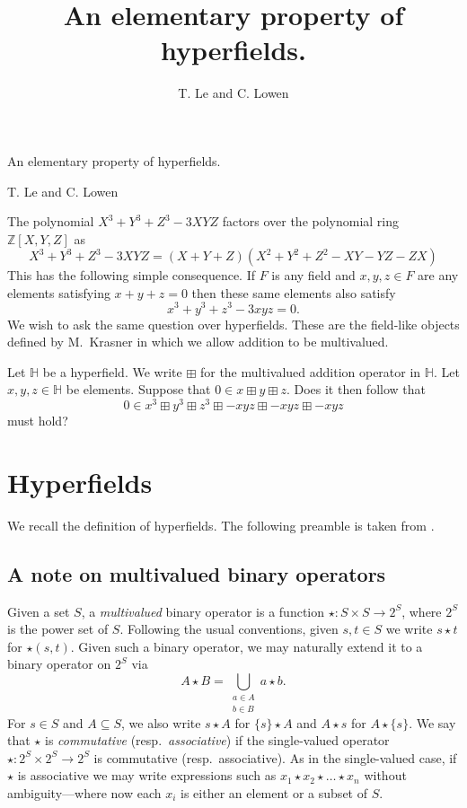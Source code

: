 \documentclass[reqno]{amsart}
\title{An elementary property of hyperfields.}
\author{T. Le and C. Lowen}
\theoremstyle{definition}
\theoremstyle{remark}
\begin{document}
\thispagestyle{plain}
\begin{center}
{\Large An elementary property of hyperfields.}\par\medskip
T. Le and C. Lowen
\end{center}

The polynomial $X^3+Y^3+Z^3-3XYZ$ factors over the polynomial ring $\mathbb{Z}[X,Y,Z]$ as
\[ X^3+Y^3+Z^3-3XYZ = (X+Y+Z)(X^2+Y^2+Z^2-XY-YZ-ZX) \]
This has the following simple consequence. If $F$ is any field and $x,y,z\in F$ are any elements satisfying $x+y+z=0$ then these same elements also satisfy
\[ x^3+y^3+z^3-3xyz=0. \]
We wish to ask the same question over hyperfields. These are the field-like objects defined by M.~Krasner in which we allow addition to be multivalued.

Let $\mathbb{H}$ be a hyperfield. We write $\boxplus$ for the multivalued addition operator in $\mathbb{H}$. Let $x,y,z\in\mathbb{H}$ be elements. Suppose that $0\in x\boxplus y\boxplus z$. Does it then follow that
\[ 0 \in x^3 \boxplus y^3 \boxplus z^3 \boxplus -xyz \boxplus -xyz \boxplus -xyz \]
must hold?
\newpage
\maketitle
\section{Hyperfields}\label{sec:problem}

We recall the definition of hyperfields. 
The following preamble is taken from \cite{le26}.
\subsection*{A note on multivalued binary operators} Given a set $S$, a \emph{multivalued} binary operator is a function $\star\colon S \times S \to 2^S$, where $2^S$ is the power set of $S$. 
Following the usual conventions, given $s, t \in S$ we write 
$s \star t$ for $\star(s, t)$.
Given such a binary operator, we may naturally extend it to a binary operator on $2^S$ via
\[
    A \star B = \bigcup_{\substack{a \in A\\b \in B}} a \star b.
\]
For $s \in S$ and $A \subseteq S$, we also write $s \star A$ for $\{s\} \star A$ and $A \star s$ for $A \star \{s\}$.
We say that $\star$ is \emph{commutative} (resp.\ \emph{associative}) if the single-valued operator $\star\colon 2^S \times 2^S \to 2^S$ is commutative (resp.\ associative). As in the single-valued case, if $\star$ is associative we may write expressions such as 
$x_1 \star x_2 \star \dots \star x_n$ without ambiguity---where now each $x_i$ is either an element or a subset of $S$.
\end{document}

